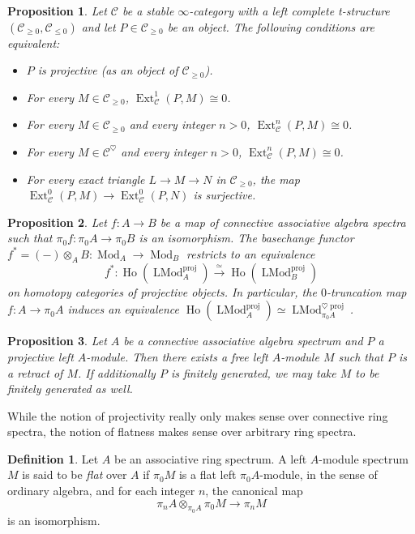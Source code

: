 \documentclass{article}
\newtheorem{proposition}{Proposition}[subsection]
\theoremstyle{definition}
\newtheorem{definition}{Definition}[subsection]
\newcommand{\C}{\mathcal{C}}
\renewcommand{\i}{\infty}
\newcommand{\too}{\longrightarrow}
\DeclareMathOperator{\LMod}{LMod}
\DeclareMathOperator{\Mod}{Mod}
\DeclareMathOperator{\Ext}{Ext}
\DeclareMathOperator{\Ho}{Ho}
\DeclareMathOperator{\proj}{proj}
\begin{document}
\begin{proposition}{\em \cite[Proposition 7.2.2.6]{HA}}
Let $\C$ be a stable $\i$-category with a left complete t-structure $(\C_{\geq 0},\C_{\leq 0})$ and let $P\in\C_{\geq 0}$ be an object.
The following conditions are equivalent:
\begin{itemize}\itemsep.1em
\item[\em{(1)}]
$P$ is projective (as an object of $\C_{\geq 0}$).
\item[\em{(2)}]
For every $M\in\C_{\geq 0}$, $\Ext^1_{\C}(P,M)\cong 0$.
\item[\em{(3)}]
For every $M\in\C_{\geq 0}$ and every integer $n > 0$, $\Ext^n_{\C}(P,M)\cong 0$.
\item[\em{(4)}]
For every $M\in\C^\heartsuit$ and every integer $n>0$,  $\Ext^n_{\C}(P,M)\cong 0$.
\item[\em{(5)}]
For every exact triangle $L\to M\to N$ in $\C_{\geq 0}$, the map $\Ext^0_\C(P,M)\to\Ext^0_\C(P,N)$ is surjective.
\end{itemize}
\end{proposition}
\begin{proposition}{\em \cite[Corollary 7.2.2.19]{HA}}\label{prop:projectives}
Let $f:A\to B$ be a map of connective associative algebra spectra such that $\pi_0 f:\pi_0 A\to\pi_0 B$ is an isomorphism.
The basechange functor $f^*=(-)\otimes_A B:\Mod_A\to\Mod_B$ restricts to an equivalence
\[
f^*:\Ho(\LMod_A^{\proj})\overset{\simeq}{\too}\Ho(\LMod_B^{\proj})
\]
on homotopy categories of projective objects.
In particular, the $0$-truncation map $f:A\to\pi_0 A$ induces an equivalence $\Ho(\LMod_A^{\proj})\simeq\LMod_{\pi_0 A}^{\heartsuit\proj}$.
\end{proposition}


\begin{proposition}{\em \cite[Proposition 7.2.2.7]{HA}}
Let $A$ be a connective associative algebra spectrum and $P$ a  projective left $A$-module.
Then there exists a free  left $A$-module $M$ such that $P$ is a retract of $M$.
If additionally $P$ is finitely generated, we may take $M$ to be finitely generated as well.
\end{proposition}
While the notion of projectivity really only makes sense over connective ring spectra, the notion of flatness makes sense over arbitrary ring spectra.

\begin{definition}
Let $A$ be an associative ring spectrum.
A left $A$-module spectrum $M$ is said to be {\em flat} over $A$ if $\pi_0 M$ is a flat left $\pi_0 A$-module, in the sense of ordinary algebra, and for each integer $n$, the canonical map
\[
\pi_n A\otimes_{\pi_0 A}\pi_0 M\too\pi_n M
\]
is an isomorphism.
\end{definition}
\end{document}
